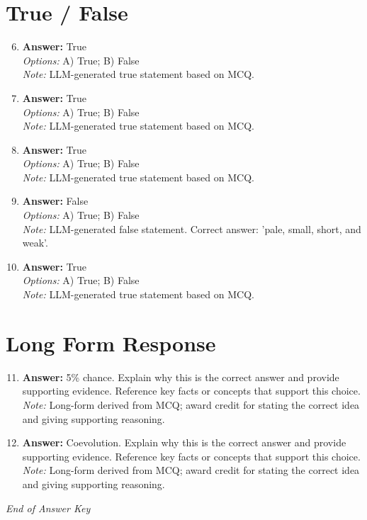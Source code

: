 \documentclass[12pt]{article}
\begin{document}
\section*{True / False}
\begin{enumerate}[label=\arabic*.]
\setcounter{enumi}{5}
\item \textbf{Answer:} True
\\ \textit{Options:} A) True; B) False
\\ \textit{Note:} LLM-generated true statement based on MCQ.
\item \textbf{Answer:} True
\\ \textit{Options:} A) True; B) False
\\ \textit{Note:} LLM-generated true statement based on MCQ.
\item \textbf{Answer:} True
\\ \textit{Options:} A) True; B) False
\\ \textit{Note:} LLM-generated true statement based on MCQ.
\item \textbf{Answer:} False
\\ \textit{Options:} A) True; B) False
\\ \textit{Note:} LLM-generated false statement. Correct answer: 'pale, small, short, and weak'.
\item \textbf{Answer:} True
\\ \textit{Options:} A) True; B) False
\\ \textit{Note:} LLM-generated true statement based on MCQ.
\end{enumerate}

\section*{Long Form Response}
\begin{enumerate}[label=\arabic*.]
\setcounter{enumi}{10}
\item \textbf{Answer:} 5\% chance. Explain why this is the correct answer and provide supporting evidence. Reference key facts or concepts that support this choice.
\\ \textit{Note:} Long-form derived from MCQ; award credit for stating the correct idea and giving supporting reasoning.
\item \textbf{Answer:} Coevolution. Explain why this is the correct answer and provide supporting evidence. Reference key facts or concepts that support this choice.
\\ \textit{Note:} Long-form derived from MCQ; award credit for stating the correct idea and giving supporting reasoning.
\end{enumerate}

\vfill
\noindent\textit{End of Answer Key}
\end{document}
